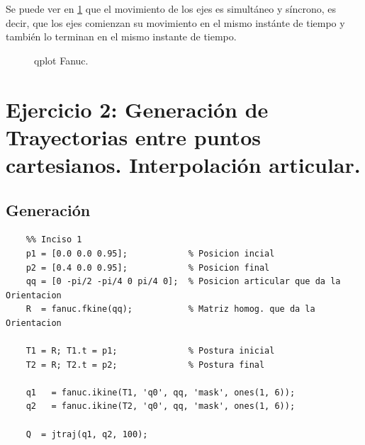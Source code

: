 \documentclass[a4paper,12pt]{article}
\begin{document}
Se puede ver en \cref{qplot fanuc} que el movimiento de los ejes es simultáneo
y síncrono, es decir, que los ejes comienzan su movimiento en el mismo instánte de tiempo
y también lo terminan en el mismo instante de tiempo.

\begin{figure}[H]
    \centering
    \begin{adjustbox}{scale = 0.65, max width=\columnwidth}
    \end{adjustbox}
    \caption{qplot Fanuc.}
    \label{qplot fanuc}
\end{figure}

\section{Ejercicio 2: Generación de Trayectorias entre puntos cartesianos. Interpolación articular.}
\subsection{Generación}
\begin{lstlisting}
    %% Inciso 1
    p1 = [0.0 0.0 0.95];            % Posicion incial
    p2 = [0.4 0.0 0.95];            % Posicion final
    qq = [0 -pi/2 -pi/4 0 pi/4 0];  % Posicion articular que da la Orientacion
    R  = fanuc.fkine(qq);           % Matriz homog. que da la Orientacion

    T1 = R; T1.t = p1;              % Postura inicial
    T2 = R; T2.t = p2;              % Postura final

    q1   = fanuc.ikine(T1, 'q0', qq, 'mask', ones(1, 6));
    q2   = fanuc.ikine(T2, 'q0', qq, 'mask', ones(1, 6));

    Q  = jtraj(q1, q2, 100);
\end{lstlisting}
\end{document}
